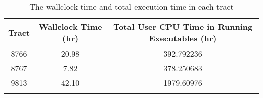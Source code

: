 \begin{longtable}{c|c|c} \label{tab:runtime}
Tract & Wallclock Time (hr) & Total User CPU Time in Running Executables (hr) \\
\hline
8766 & 20.98 & 392.792236 \\
8767 &  7.82 & 378.250683 \\
9813 & 42.10 & 1979.60976 \\
\caption{The wallclock time and total execution time in each tract}
\end{longtable}
